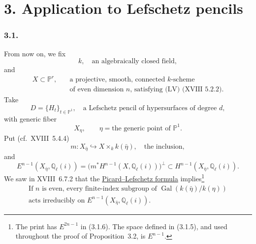 \section*{3. Application to Lefschetz pencils}

\subsubsection*{3.1.}
From now on, we fix
\begin{equation}\tag{3.1.0}
k,\quad\text{an algebraically closed field},
\end{equation}
and
\begin{equation}\tag{3.1.1}
\begin{aligned}
X\subset\mathbb P^r,\quad
&\text{a projective, smooth, connected }k\text{-scheme}\\
&\text{of even dimension }n\text{, satisfying (LV) (XVIII~5.2.2).}
\end{aligned}
\end{equation}
Take
\begin{equation}\tag{3.1.2}
D=\{H_t\}_{t\in\mathbb P^1},
\quad\text{a Lefschetz pencil of hypersurfaces of degree $d$},
\end{equation}
with generic fiber
\begin{equation}\tag{3.1.3}
X_\eta,\qquad \eta=\text{the generic point of }\mathbb P^1.
\end{equation}
Put (cf.~XVIII~5.4.4)
\begin{equation}\tag{3.1.4}
m:X_{\bar\eta}\hookrightarrow X\times_k k(\bar\eta),
\quad\text{the inclusion},
\end{equation}
and
\begin{equation}\tag{3.1.5}
E^{n-1}(X_{\bar\eta},\mathbb Q_\ell(i))
=\bigl(m^*H^{n-1}(X,\mathbb Q_\ell(i))\bigr)^\perp
\subset H^{n-1}(X_{\bar\eta},\mathbb Q_\ell(i)).
\end{equation}
We saw in XVIII~6.7.2 that the \underline{Picard--Lefschetz formula}
implies\footnote{The print has $E^{2n-1}$ in (3.1.6).  The space defined in
(3.1.5), and used throughout the proof of Proposition~3.2, is
$E^{n-1}$.}
\begin{equation}\tag{3.1.6}
\begin{gathered}
\text{If }n\text{ is even, every finite-index subgroup of }
\operatorname{Gal}(k(\bar\eta)/k(\eta))\\
\text{acts irreducibly on }E^{n-1}(X_{\bar\eta},\mathbb Q_\ell(i)).
\end{gathered}
\end{equation}

